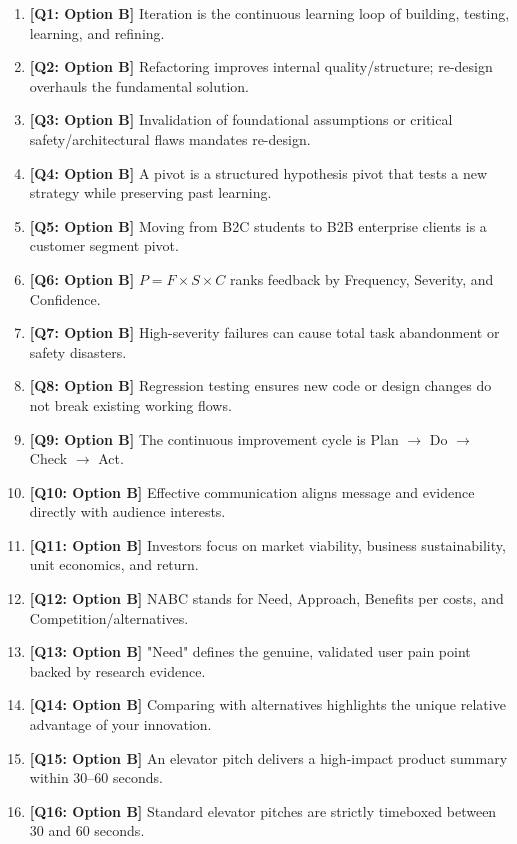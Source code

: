 \begin{expbox}
\begin{enumerate}[leftmargin=6mm, itemsep=2.5mm]
  \item \textbf{[Q1: Option B]} Iteration is the continuous learning loop of building, testing, learning, and refining.
  \item \textbf{[Q2: Option B]} Refactoring improves internal quality/structure; re-design overhauls the fundamental solution.
  \item \textbf{[Q3: Option B]} Invalidation of foundational assumptions or critical safety/architectural flaws mandates re-design.
  \item \textbf{[Q4: Option B]} A pivot is a structured hypothesis pivot that tests a new strategy while preserving past learning.
  \item \textbf{[Q5: Option B]} Moving from B2C students to B2B enterprise clients is a customer segment pivot.
  \item \textbf{[Q6: Option B]} $P = F \times S \times C$ ranks feedback by Frequency, Severity, and Confidence.
  \item \textbf{[Q7: Option B]} High-severity failures can cause total task abandonment or safety disasters.
  \item \textbf{[Q8: Option B]} Regression testing ensures new code or design changes do not break existing working flows.
  \item \textbf{[Q9: Option B]} The continuous improvement cycle is Plan $\rightarrow$ Do $\rightarrow$ Check $\rightarrow$ Act.
  \item \textbf{[Q10: Option B]} Effective communication aligns message and evidence directly with audience interests.
  \item \textbf{[Q11: Option B]} Investors focus on market viability, business sustainability, unit economics, and return.
  \item \textbf{[Q12: Option B]} NABC stands for Need, Approach, Benefits per costs, and Competition/alternatives.
  \item \textbf{[Q13: Option B]} "Need" defines the genuine, validated user pain point backed by research evidence.
  \item \textbf{[Q14: Option B]} Comparing with alternatives highlights the unique relative advantage of your innovation.
  \item \textbf{[Q15: Option B]} An elevator pitch delivers a high-impact product summary within 30–60 seconds.
  \item \textbf{[Q16: Option B]} Standard elevator pitches are strictly timeboxed between 30 and 60 seconds.

\end{enumerate}
\end{expbox}
